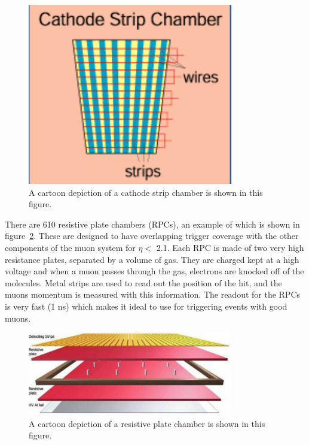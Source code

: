 \begin{figure}[!htb]
\begin{center}
\includegraphics[width=0.8\textwidth]{cms/figs/CSC.pdf}
\caption{ A cartoon depiction of a cathode strip chamber is shown in this figure. 
\label{fig:CSC}
}
\end{center}
\end{figure}

There are 610 resistive plate chambers (RPCs), an example of which is shown in figure~\ref{fig:RPC}.
These are designed to have overlapping trigger coverage with the other components of the muon system for $\eta <$ 2.1.
Each RPC is made of two very high resistance plates, separated by a volume of gas.
They are charged kept at a high voltage and when a muon passes through the gas, electrons are knocked off of the molecules.
Metal strips are used to read out the position of the hit, and the muons momentum is measured with this information.
The readout for the RPCs is very fast (1 ns) which makes it ideal to use for triggering events with good muons.

\begin{figure}[!htb]
  \begin{center}
    \includegraphics[width=0.8\textwidth]{cms/figs/RPClayers.pdf}
    \caption{
      \label{fig:RPC}
      A cartoon depiction of a resistive plate chamber is shown in this figure. 
    }
  \end{center}
\end{figure}

